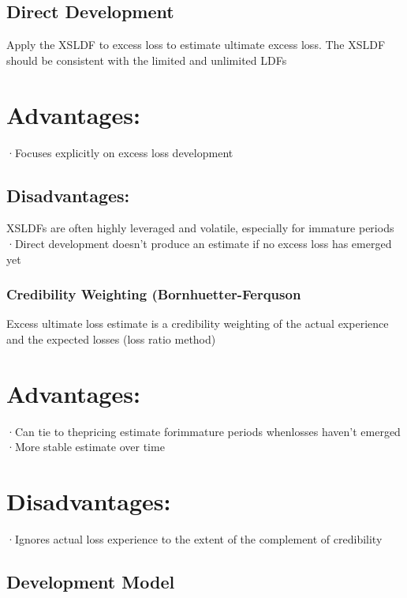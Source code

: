 \documentclass[
]{article}
\begin{document}
\subsection{Direct Development}\label{direct-development}

Apply the XSLDF to excess loss to estimate ultimate excess loss. The
XSLDF should be consistent with the limited and unlimited LDFs

\section{Advantages:}\label{advantages-6}

·Focuses explicitly on excess loss development

\subsection{Disadvantages:}\label{disadvantages-4}

XSLDFs are often highly leveraged and volatile, especially for immature
periods ·Direct development doesn't produce an estimate if no excess
loss has emerged yet

\subsubsection{Credibility Weighting
(Bornhuetter-Ferquson}\label{credibility-weighting-bornhuetter-ferquson}

Excess ultimate loss estimate is a credibility weighting of the actual
experience and the expected losses (loss ratio method)

\section{Advantages:}\label{advantages-7}

·Can tie to thepricing estimate forimmature periods whenlosses haven't
emerged ·More stable estimate over time

\section{Disadvantages:}\label{disadvantages-5}

·Ignores actual loss experience to the extent of the complement of
credibility

\subsection{Development Model}\label{development-model}
\end{document}
